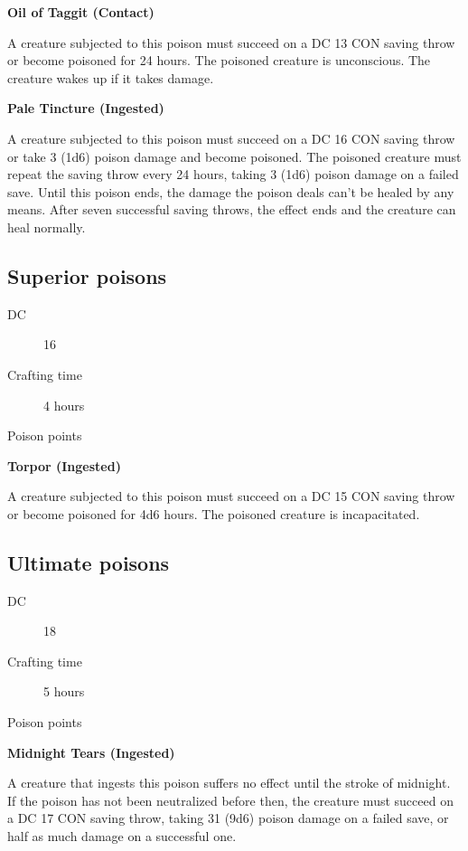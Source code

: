 \textbf{Oil of Taggit (Contact)}

A creature subjected to this poison must succeed on a DC 13 CON saving throw or become poisoned for 24 hours. The poisoned creature is unconscious. The creature wakes up if it takes damage.

\textbf{Pale Tincture (Ingested)}

A creature subjected to this poison must succeed on a DC 16 CON saving throw or take 3 (1d6) poison damage and become poisoned. The poisoned creature must repeat the saving throw every 24 hours, taking 3 (1d6) poison damage on a failed save. Until this poison ends, the damage the poison deals can't be healed by any means. After seven successful saving throws, the effect ends and the creature can heal normally.

\subsection{Superior poisons}

\begin{description}
\item [DC] 16
\item [Crafting time] 4 hours
\item [Poison points] \poison\poison\poison\poison
\end{description}

\textbf{Torpor (Ingested)}

A creature subjected to this poison must succeed on a DC 15 CON saving throw or become poisoned for 4d6 hours. The poisoned creature is incapacitated.

\subsection{Ultimate poisons}

\begin{description}
\item [DC] 18
\item [Crafting time] 5 hours
\item [Poison points] \poison\poison\poison\poison\poison
\end{description}

\textbf{Midnight Tears (Ingested)}

A creature that ingests this poison suffers no effect until the stroke of midnight. If the poison has not been neutralized before then, the creature must succeed on a DC 17 CON saving throw, taking 31 (9d6) poison damage on a failed save, or half as much damage on a successful one.


